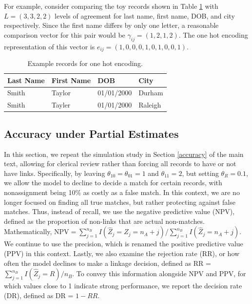 \documentclass[ba]{imsart}
\begin{document}
	For example, consider comparing the toy records shown in Table \ref{tab:ohe} with $L = (3, 3, 2, 2)$ levels of agreement for last name, first name, DOB, and city respectively. Since the first name differs by only one letter, a reasonable comparison vector for this pair would be $\gamma_{ij} = (1, 2, 1, 2)$. The one hot encoding representation of this vector is $e_{ij} = (1, 0, 0, 0, 1, 0, 1, 0, 0, 1)$. 
	\begin{table}[h!]
		\centering
		\begin{tabular}[h!]{llll}
			Last Name & First Name & DOB & City \\
			\hline
			Smith & Taylor & 01/01/2000 & Durham\\
			Smith & Tayler & 01/01/2000 & Raleigh\\
			\hline
		\end{tabular}
		\caption{Example records for one hot encoding.}\label{tab:ohe}
	\end{table}

	\hypertarget{partial}{%
	\subsection{Accuracy under Partial Estimates}\label{partial}}

In this section, we repeat the simulation study in Section \ref{accuracy} of the main text, allowing for clerical review rather than forcing all records to have or not have links.  Specifically, by leaving $\theta_{10} = \theta_{01} = 1$ and $\theta_{11} = 2$, but setting $\theta_R = 0.1$, we allow the model to decline to decide a match for certain records, with nonassignment being 10\% as costly as a false match. In this context, we are no longer focused on finding all true matches, but rather protecting against false matches. Thus, instead of recall, we use the negative predictive value (NPV), defined as the proportion of non-links that are actual non-matches. Mathematically, $\text{NPV} = \sum_{j=1}^{n_B} I(\hat{Z}_j = Z_j = n_A + j)$/$\sum_{j=1}^{n_B} I(\hat{Z}_j = n_A + j)$. We continue to use the precision, which is renamed the positive predictive value (PPV) in this context. Lastly, we also examine the rejection rate (RR), or how often the model declines to make a linkage decision, defined as RR = $\sum_{j=1}^{n_B} I(\hat{Z}_j = R)/n_B$. To convey this information alongside NPV and PPV, for which values close to 1 indicate strong performance, we report the decision rate (DR), defined as DR = $1 - RR$.
\end{document}
